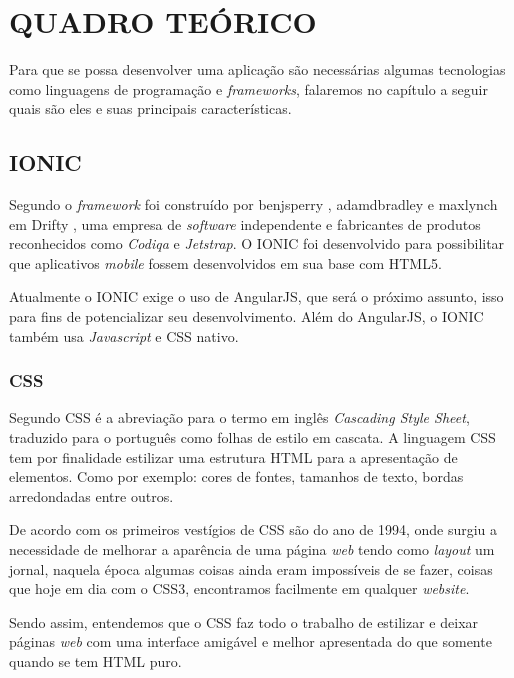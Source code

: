 \chapter{QUADRO TEÓRICO}

	\par Para que se possa desenvolver uma aplicação são necessárias algumas tecnologias como linguagens de programação e \textit{frameworks}, falaremos no capítulo a seguir quais são eles e suas principais características.

\section{IONIC}
	\par Segundo  o \textit{framework} foi construído por benjsperry , adamdbradley e maxlynch em Drifty , uma empresa de \textit{software} independente e fabricantes de produtos reconhecidos como \textit{Codiqa} e \textit{Jetstrap}. O IONIC foi desenvolvido para possibilitar que aplicativos \textit{mobile} fossem desenvolvidos em sua base com HTML5.
	\par Atualmente o IONIC exige o uso de AngularJS, que será o próximo assunto, isso para fins de potencializar seu desenvolvimento. Além do AngularJS, o IONIC também usa \textit{Javascript} e CSS nativo.

	\subsection{CSS}
		\par Segundo  CSS é a abreviação para o termo em inglês \textit{Cascading Style Sheet}, traduzido para o
		português como folhas de estilo em cascata. A linguagem CSS tem por finalidade estilizar uma estrutura HTML para a apresentação de elementos. Como por exemplo: cores de fontes, tamanhos de texto, bordas arredondadas entre outros.
		\par De acordo com  os primeiros vestígios de CSS são do ano de 1994, onde surgiu a necessidade de melhorar a aparência de uma página \textit{web} tendo como \textit{layout} um jornal, naquela época algumas coisas ainda eram impossíveis de se fazer, coisas que hoje em dia com o CSS3, encontramos facilmente em qualquer \textit{website}.
		\par Sendo assim, entendemos que o CSS faz todo o trabalho de estilizar e deixar páginas \textit{web} com uma interface amigável e melhor apresentada do que somente quando se tem HTML puro.
		
